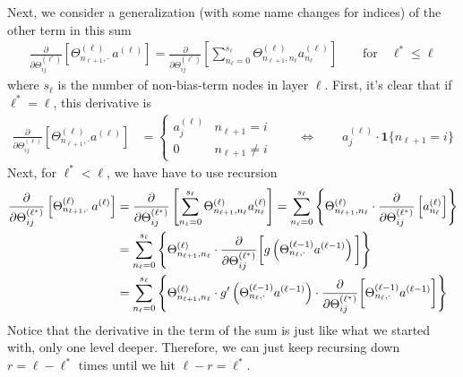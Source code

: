 \documentclass[12pt]{article}
\begin{document}
Next, we consider a generalization (with some name changes for indices)
of the other term in this sum
\begin{align*}
  \frac{\partial}{\partial \Theta^{(\ell^*)}_{ij}}
  \left[
  \Theta^{(\ell)}_{n_{\ell+1},\cdot} \, a^{(\ell)}
  \right]
  =
  \frac{\partial}{\partial \Theta^{(\ell^*)}_{ij}}
  \left[
  \sum_{n_\ell=0}^{s_\ell}
  \Theta^{(\ell)}_{n_{\ell+1},n_\ell} a^{(\ell)}_{n_\ell}
  \right]
  \qquad \text{for}\quad
  \ell^* \leq \ell
\end{align*}
where $s_\ell$ is the number of non-bias-term nodes in layer $\ell$.
First, it's clear that if $\ell^*=\ell$, this derivative is
\begin{align}
  \frac{\partial}{\partial \Theta^{(\ell)}_{ij}}
  \left[
  \Theta^{(\ell)}_{n_{\ell+1},\cdot} a^{(\ell)}
  \right]
  &=
  \begin{cases}
    a_j^{(\ell)} & n_{\ell+1} = i \\
    0 & n_{\ell+1}\neq i
  \end{cases}
  \qquad\iff\qquad
  a_j^{(\ell)} \cdot \mathbf{1}\{n_{\ell+1}=i\}
  \label{indicator}
\end{align}
Next, for $\ell^*<\ell$, we have have to use recursion
\begin{align}
  \frac{\partial}{\partial \Theta^{(\ell^*)}_{ij}}
  \left[
  \Theta^{(\ell)}_{n_{\ell+1},\cdot} \,a^{(\ell)}
  \right]
  &=
  \frac{\partial}{\partial \Theta^{(\ell^*)}_{ij}}
  \left[
  \sum_{n_\ell=0}^{s_\ell}
  \Theta^{(\ell)}_{n_{\ell+1},n_\ell} a^{(\ell)}_{n_\ell}
  \right]
  =
  \sum_{n_\ell=0}^{s_\ell}
  \left\{
  \Theta^{(\ell)}_{n_{\ell+1},n_\ell}
  \cdot
  \frac{\partial}{\partial \Theta^{(\ell^*)}_{ij}}
  \left[
  a^{(\ell)}_{n_\ell}
  \right]
  \right\}
  \notag
  \\
  &=
  \sum_{n_{\ell}=0}^{s_\ell}
  \left\{
  \Theta^{(\ell)}_{n_{\ell+1},n_\ell}
  \cdot
  \frac{\partial}{\partial \Theta^{(\ell^*)}_{ij}}
  \bigg[
  g\left(
  \Theta_{n_\ell,\cdot}^{(\ell-1)}
  a^{(\ell-1)}
  \right)
  \bigg]
  \right\}
  \notag
  \\
  &=
  \sum_{n_\ell=0}^{s_\ell}
  \left\{
  \Theta^{(\ell)}_{n_{\ell+1},n_\ell}
  \cdot
  g'\left(
  \Theta_{n_\ell,\cdot}^{(\ell-1)}
  a^{(\ell-1)}
  \right)
  \cdot
  \frac{\partial}{\partial \Theta^{(\ell^*)}_{ij}}
  \bigg[
  \Theta_{n_\ell,\cdot}^{(\ell-1)}
  a^{(\ell-1)}
  \bigg]
  \right\}
  \label{recurse}
\end{align}
Notice that the derivative in the term of the sum is just like what we
started with, only one level deeper.
Therefore, we can just keep recursing down $r=\ell-\ell^*$ times until
we hit $\ell-r=\ell^*$.
\end{document}
